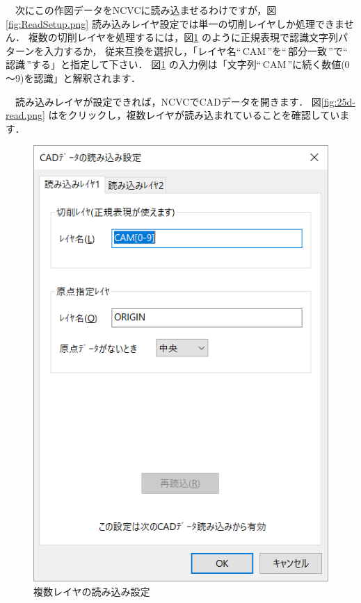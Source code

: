 \begin{minipage}[t]{0.5\textwidth}
　次にこの作図データをNCVCに読み込ませるわけですが，図\ref{fig:ReadSetup.png} 読み込みレイヤ設定では単一の切削レイヤしか処理できません．
複数の切削レイヤを処理するには，図\ref{fig:25d-setup.png} のように正規表現\footnotemark[2]で認識文字列パターンを入力するか，
従来互換を選択し，「レイヤ名``\,CAM\,''を``\,部分一致\,''で``\,認識\,''する」と指定して下さい．
図\ref{fig:25d-setup.png} の入力例は「文字列``\,CAM\,''に続く数値(0～9)を認識」と解釈されます．

　読み込みレイヤが設定できれば，NCVCでCADデータを開きます．
図\ref{fig:25d-read.png} はをクリックし，複数レイヤが読み込まれていることを確認しています．
\end{minipage}
\begin{minipage}[t]{0.5\textwidth}
\vspace*{-2zh}
\begin{figure}[H]
\centering
\includegraphics[scale=0.7]{No3/fig/25d-setup.png}
\caption{複数レイヤの読み込み設定}
\label{fig:25d-setup.png}
\end{figure}
\end{minipage}

